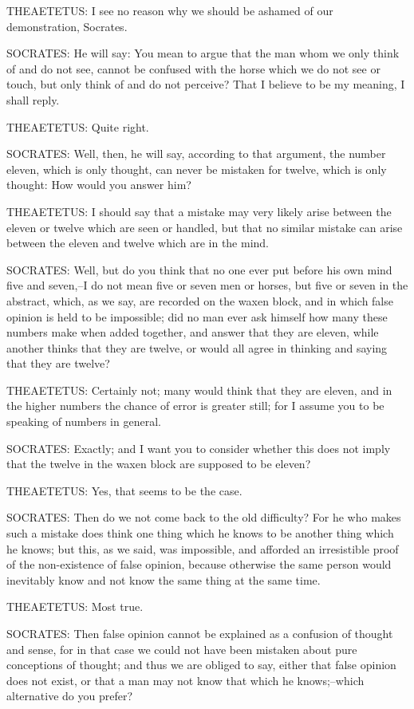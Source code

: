 THEAETETUS: I see no reason why we should be ashamed of our
demonstration, Socrates.

SOCRATES: He will say: You mean to argue that the man whom we only think
of and do not see, cannot be confused with the horse which we do not see
or touch, but only think of and do not perceive? That I believe to be my
meaning, I shall reply.

THEAETETUS: Quite right.

SOCRATES: Well, then, he will say, according to that argument, the
number eleven, which is only thought, can never be mistaken for twelve,
which is only thought: How would you answer him?

THEAETETUS: I should say that a mistake may very likely arise between
the eleven or twelve which are seen or handled, but that no similar
mistake can arise between the eleven and twelve which are in the mind.

SOCRATES: Well, but do you think that no one ever put before his own
mind five and seven,--I do not mean five or seven men or horses, but
five or seven in the abstract, which, as we say, are recorded on the
waxen block, and in which false opinion is held to be impossible; did
no man ever ask himself how many these numbers make when added together,
and answer that they are eleven, while another thinks that they are
twelve, or would all agree in thinking and saying that they are twelve?

THEAETETUS: Certainly not; many would think that they are eleven, and
in the higher numbers the chance of error is greater still; for I assume
you to be speaking of numbers in general.

SOCRATES: Exactly; and I want you to consider whether this does not
imply that the twelve in the waxen block are supposed to be eleven?

THEAETETUS: Yes, that seems to be the case.

SOCRATES: Then do we not come back to the old difficulty? For he who
makes such a mistake does think one thing which he knows to be another
thing which he knows; but this, as we said, was impossible, and afforded
an irresistible proof of the non-existence of false opinion, because
otherwise the same person would inevitably know and not know the same
thing at the same time.

THEAETETUS: Most true.

SOCRATES: Then false opinion cannot be explained as a confusion of
thought and sense, for in that case we could not have been mistaken
about pure conceptions of thought; and thus we are obliged to say,
either that false opinion does not exist, or that a man may not know
that which he knows;--which alternative do you prefer?

